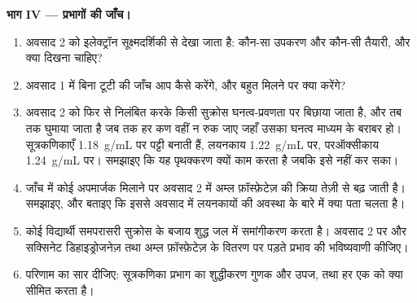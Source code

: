 \begin{problem}
\medskip
\noindent\textbf{भाग IV --- प्रभागों की जाँच।}
\begin{enumerate}[resume]
  \item अवसाद 2 को इलेक्ट्रॉन सूक्ष्मदर्शिकी से देखा जाता है: कौन-सा
        उपकरण और कौन-सी तैयारी, और क्या दिखना चाहिए?
  \item अवसाद 1 में बिना टूटी  की जाँच आप कैसे करेंगे, और बहुत
        मिलने पर क्या करेंगे?
  \item अवसाद 2 को फिर से निलंबित करके किसी सुक्रोस घनत्व-प्रवणता पर
        बिछाया जाता है, और तब तक घुमाया जाता है जब तक हर कण वहीं न रुक
        जाए जहाँ उसका घनत्व माध्यम के बराबर हो। सूत्रकणिकाएँ
        \qty{1.18}{g/mL} पर पट्टी बनाती हैं, लयनकाय \qty{1.22}{g/mL}
        पर, परऑक्सीकाय \qty{1.24}{g/mL} पर। समझाइए कि यह पृथक्करण
        क्यों काम करता है जबकि  इसे नहीं कर सका।
  \item जाँच में कोई अपमार्जक मिलाने पर अवसाद 2 में अम्ल फ़ॉस्फ़ेटेज़ की
        क्रिया तेज़ी से बढ़ जाती है। समझाइए, और बताइए कि इससे अवसाद में
        लयनकायों की अवस्था के बारे में क्या पता चलता है।
  \item कोई विद्यार्थी समपरासरी सुक्रोस के बजाय शुद्ध जल में
        समांगीकरण करता है। अवसाद 2 पर और सक्सिनेट डिहाइड्रोजनेज़ तथा
        अम्ल फ़ॉस्फ़ेटेज़ के वितरण पर पड़ते प्रभाव की भविष्यवाणी कीजिए।
  \item परिणाम का सार दीजिए: सूत्रकणिका प्रभाग का शुद्धीकरण गुणक और
        उपज, तथा हर एक को क्या सीमित करता है।
\end{enumerate}
\end{problem}
